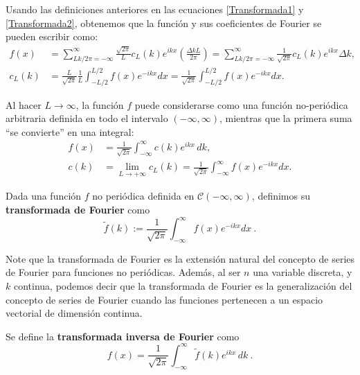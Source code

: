 Usando las definiciones anteriores en las ecuaciones \eqref{Transformada1} y \eqref{Transformada2}, obtenemos que la función y sus coeficientes de Fourier se pueden escribir como: 
\begin{align*}
    f(x)&= \sum_{Lk/2\pi = -\infty}^{\infty} \frac{\sqrt{2\pi}}{L} c_L(k) e^{ikx} \left( \frac{\Delta k L}{2\pi}\right) = \sum_{Lk/2\pi = -\infty}^{\infty}  \frac{1}{\sqrt{2\pi}} c_L(k) e^{ikx} \Delta k , \\
  c_L(k) &= \frac{L}{\sqrt{2\pi}} \frac{1}{L} \int_{-L/2}^{L/2} f(x) e^{-ikx} dx = \frac{1}{\sqrt{2\pi}} \int_{-L/2}^{L/2} f(x) e^{-ikx} dx.
\end{align*}

Al hacer $L \to \infty$, la función $f$ puede considerarse como una función no-periódica arbitraria definida en todo el intervalo $(-\infty, \infty)$, mientras que la primera suma ``se convierte'' en una integral:
\begin{align*}
    f(x)& = \frac{1}{\sqrt{2\pi}} \int_{-\infty}^{\infty} c(k) e^{ikx} \,dk, \\
  c(k) & = \lim_{L\to + \infty} c_L(k) = \frac{1}{\sqrt{2\pi}} \int_{-\infty}^{\infty} f(x) e^{-ikx} dx.
\end{align*}

\begin{defi} 
    Dada una función $f$ no periódica definida en $\mathscr{C}(-\infty, \infty)$, definimos su \textbf{transformada de Fourier} como 
    \begin{equation}\label{T.Fourier}
        \boxed{\tilde{f}(k) := \frac{1}{\sqrt{2\pi}} \int_{-\infty}^{\infty} f(x) e^{-ikx} dx \ .} 
    \end{equation}  
\end{defi}

Note que la transformada de Fourier es la extensión natural del concepto de series de Fourier para funciones no periódicas. Además, al ser $n$ una variable discreta, y $k$ continua, podemos decir que la transformada de Fourier es la generalización del concepto de series de Fourier cuando las funciones pertenecen a un espacio vectorial de dimensión continua.

\begin{defi}
    Se define la \textbf{transformada inversa de Fourier} como
      \begin{equation}\label{I.Fourier}
     \boxed{f(x) = \frac{1}{\sqrt{2\pi}} \int_{-\infty}^{\infty} \tilde{f}(k) e^{ikx} \,dk \ .} 
    \end{equation}  
\end{defi}

